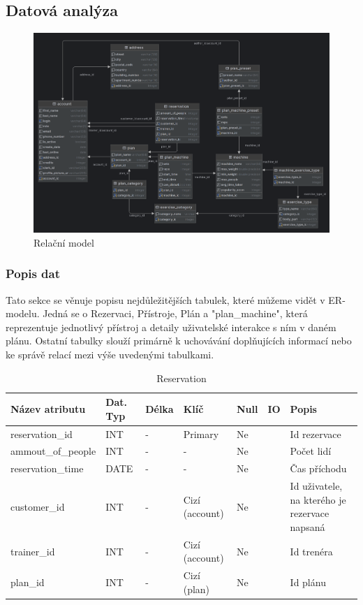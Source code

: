 \subsection{Datová analýza}

\begin{figure}[h!]
	\includegraphics[width=1\textwidth]{Figures/ermodel.png}
	\caption{ Relační model}
	\label{fig:RelationalModel}
\end{figure}

\subsubsection{Popis dat}
Tato sekce se věnuje popisu nejdůležitějších tabulek, které můžeme vidět v ER-modelu. Jedná se o Rezervaci, Přístroje, Plán a "plan\_machine", která reprezentuje jednotlivý přístroj a detaily uživatelské interakce s ním v daném plánu. Ostatní tabulky slouží primárně k uchovávání doplňujících informací nebo ke správě relací mezi výše uvedenými tabulkami.

\begin{table}[h!]
	\caption{Reservation}
    \label{tab:dat-dictionary-reservation}
	\begin{tabular}{|p{3.5cm}|p{2cm}|p{1cm}|p{2.5cm}|p{.75cm}|p{.5cm}|p{3.25cm}|}
		\hline
        \textbf{Název atributu} & \textbf{Dat. Typ} & \textbf{Délka} & \textbf{Klíč} & \textbf{Null} & \textbf{IO} & \textbf{Popis} \\
        \hline
        reservation\_id & INT & - & Primary & Ne & & Id rezervace \\
        \hline
        ammout\_of\_people & INT & - & - & Ne & & Počet lidí \\
        \hline
        reservation\_time & DATE & - & - & Ne & & Čas příchodu \\
        \hline
        customer\_id & INT & - & Cizí (account) & Ne & & Id uživatele, na kterého je rezervace napsaná \\
        \hline
        trainer\_id & INT & - & Cizí (account) & Ne & & Id trenéra \\
        \hline
        plan\_id & INT & - & Cizí (plan) & Ne & & Id plánu \\
        \hline
	\end{tabular}
\end{table}

